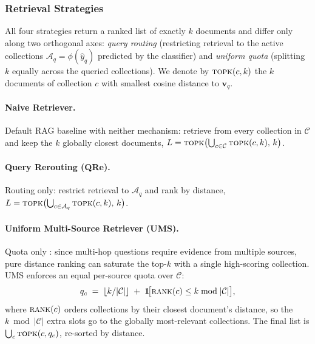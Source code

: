 

\subsubsection{Retrieval Strategies}
\label{sec:retrieval-strategies}

All four strategies return a ranked list of exactly $k$ documents and differ
only along two orthogonal axes: \emph{query routing} (restricting retrieval
to the active collections $\mathcal{A}_q = \phi(\hat{y}_q)$ predicted by the
classifier) and \emph{uniform quota} (splitting $k$ equally across the
queried collections). We denote by $\textsc{topk}(c, k)$ the $k$ documents of
collection $c$ with smallest cosine distance to $\mathbf{v}_q$.

\paragraph{Naive Retriever.}
Default RAG baseline with neither mechanism: retrieve from every collection
in $\mathcal{C}$ and keep the $k$ globally closest documents,
$L = \textsc{topk}\bigl(\bigcup_{c \in \mathcal{C}} \textsc{topk}(c, k),\, k\bigr)$.

\paragraph{Query Rerouting (QRe).}
Routing only: restrict retrieval to $\mathcal{A}_q$ and rank by distance,
$L = \textsc{topk}\bigl(\bigcup_{c \in \mathcal{A}_q} \textsc{topk}(c, k),\, k\bigr)$.

\paragraph{Uniform Multi-Source Retriever (UMS).}
Quota only : since multi-hop questions require evidence from multiple sources,
pure distance ranking can saturate the top-$k$ with a single high-scoring
collection. UMS enforces an equal per-source quota over $\mathcal{C}$:
\begin{equation}
\label{eq:quota}
q_c \;=\; \lfloor k / |\mathcal{C}| \rfloor
       \;+\; \mathbf{1}\!\bigl[\textsc{rank}(c) \leq k \bmod |\mathcal{C}|\bigr],
\end{equation}
where $\textsc{rank}(c)$ orders collections by their closest document's
distance, so the $k \bmod |\mathcal{C}|$ extra slots go to the globally
most-relevant collections. The final list is $\bigcup_c \textsc{topk}(c, q_c)$,
re-sorted by distance.

